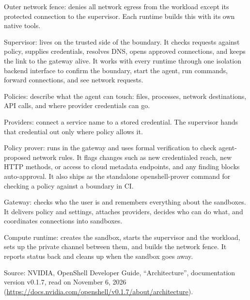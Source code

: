 Outer network fence: denies all network egress from the workload except its protected connection to the supervisor. Each runtime builds this with its own native tools.

Supervisor: lives on the trusted side of the boundary. It checks requests against policy, supplies credentials, resolves DNS, opens approved connections, and keeps the link to the gateway alive. It works with every runtime through one isolation backend interface to confirm the boundary, start the agent, run commands, forward connections, and see network requests.

Policies: describe what the agent can touch: files, processes, network destinations, API calls, and where provider credentials can go.

Providers: connect a service name to a stored credential. The supervisor hands that credential out only where policy allows it.

Policy prover: runs in the gateway and uses formal verification to check agent-proposed network rules. It flags changes such as new credentialed reach, new HTTP methods, or access to cloud metadata endpoints, and any finding blocks auto-approval. It also ships as the standalone openshell-prover command for checking a policy against a boundary in CI.

Gateway: checks who the user is and remembers everything about the sandboxes. It delivers policy and settings, attaches providers, decides who can do what, and coordinates connections into sandboxes.

Compute runtime: creates the sandbox, starts the supervisor and the workload, sets up the private channel between them, and builds the network fence. It reports status back and cleans up when the sandbox goes away.

Source: NVIDIA, OpenShell Developer Guide, ``Architecture'', documentation version v0.1.7, read on November 6, 2026 (\url{https://docs.nvidia.com/openshell/v0.1.7/about/architecture}).

